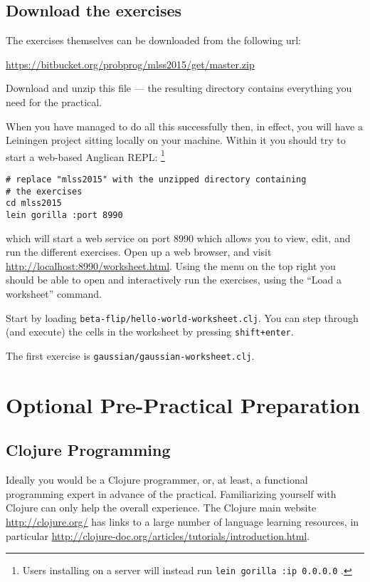 \documentclass{article}
\begin{document}
\subsection{Download the exercises}

The exercises themselves can be downloaded from the following url:

\url{https://bitbucket.org/probprog/mlss2015/get/master.zip}

Download and unzip this file --- the resulting directory contains everything you need for the practical.

When you have managed to do all this successfully then, in effect, you will have a 
Leiningen project sitting locally on your machine.   Within it  
you should try to start a web-based Anglican REPL:
\footnote{Users installing on a server will instead run \texttt{lein gorilla :ip 0.0.0.0} .}

\begin{verbatim}
# replace "mlss2015" with the unzipped directory containing
# the exercises
cd mlss2015
lein gorilla :port 8990
\end{verbatim}
which will start a web service on port 8990 which allows you to view, edit, and run
the different exercises.
Open up a web browser, and visit \url{http://localhost:8990/worksheet.html}.
Using the menu on the top right you should be able to open and interactively run the exercises,
using the ``Load a worksheet'' command.

Start by loading \texttt{beta-flip/hello-world-worksheet.clj}.
You can step through (and execute) the cells in the worksheet by pressing \texttt{shift+enter}.

The first exercise is \texttt{gaussian/gaussian-worksheet.clj}.  

\section{Optional Pre-Practical Preparation}


\subsection{Clojure Programming}

Ideally you would be a Clojure programmer, or, at least, a functional 
programming expert in advance of the practical.  Familiarizing yourself
with Clojure can only help the overall experience.  The Clojure main website
\url{http://clojure.org/} has links to a large number of language 
learning resources, in particular \url{http://clojure-doc.org/articles/tutorials/introduction.html}.
\end{document}
